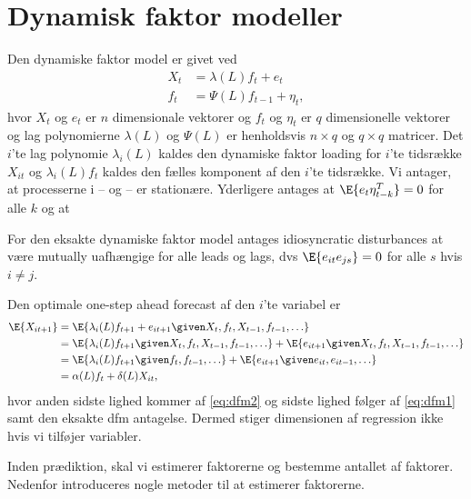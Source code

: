 \chapter{Dynamisk faktor modeller}

Den dynamiske faktor model er givet ved
\begin{align}
X_t &= \lambda(L) f_t + e_t \label{eq:dfm1}\\
f_t &= \Psi(L) f_{t-1} + \eta_t, \label{eq:dfm2}
\end{align} 
hvor $X_t$ og $e_t$ er \(n\) dimensionale vektorer og $f_t$ og $\eta_t$ er \(q\) dimensionelle vektorer og lag polynomierne $\lambda(L)$ og $\Psi(L)$ er henholdsvis $n \times q$ og $q \times q$ matricer.
Det $i$'te lag polynomie $\lambda_i(L)$ kaldes den dynamiske faktor loading for $i$'te tidsrække $X_{it}$ og $\lambda_i(L) f_t$ kaldes den fælles komponent af den $i$'te tidsrække.
Vi antager, at processerne i -- og -- er stationære.
Yderligere antages at $\E{e_t \eta_{t-k}^T}=0$ for alle $k$ og at

For den eksakte dynamiske faktor model antages idiosyncratic disturbances at være mutually uafhængige for alle leads og lags, dvs $\E{e_{it} e_{js}}=0$ for alle $s$ hvis $i \neq j$.

Den optimale one-step ahead forecast af den $i$'te variabel er
\begin{align*}
\E{X_{it+1}} &= \E{\lambda_i(L)f_{t+1} + e_{it+1} \given X_t,f_t,X_{t-1},f_{t-1},\ldots} \\
&= \E{\lambda_i(L)f_{t+1} \given X_t,f_t,X_{t-1},f_{t-1},\ldots} + \E{e_{it+1} \given X_t,f_t,X_{t-1},f_{t-1},\ldots} \\
&= \E{\lambda_i(L)f_{t+1} \given f_t, f_{t-1}, \ldots} + \E{e_{it+1} \given e_{it}, e_{it-1}, \ldots} \\
&= \alpha(L) f_t + \delta(L) X_{it},
\end{align*}
hvor anden sidste lighed kommer af \eqref{eq:dfm2} og sidste lighed følger af \eqref{eq:dfm1} samt den eksakte dfm antagelse.
Dermed stiger dimensionen af regression ikke hvis vi tilføjer variabler.

Inden prædiktion, skal vi estimerer faktorerne og bestemme antallet af faktorer.
Nedenfor introduceres nogle metoder til at estimerer faktorerne.

